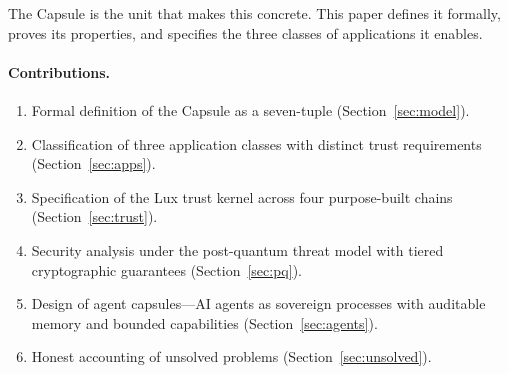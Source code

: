 The Capsule is the unit that makes this concrete. This paper defines it formally,
proves its properties, and specifies the three classes of applications it enables.

\paragraph{Contributions.}
\begin{enumerate}[label=(\roman*),nosep]
  \item Formal definition of the Capsule as a seven-tuple (Section~\ref{sec:model}).
  \item Classification of three application classes with distinct trust requirements
        (Section~\ref{sec:apps}).
  \item Specification of the Lux trust kernel across four purpose-built chains
        (Section~\ref{sec:trust}).
  \item Security analysis under the post-quantum threat model with tiered
        cryptographic guarantees (Section~\ref{sec:pq}).
  \item Design of agent capsules---AI agents as sovereign processes with auditable
        memory and bounded capabilities (Section~\ref{sec:agents}).
  \item Honest accounting of unsolved problems (Section~\ref{sec:unsolved}).
\end{enumerate}

